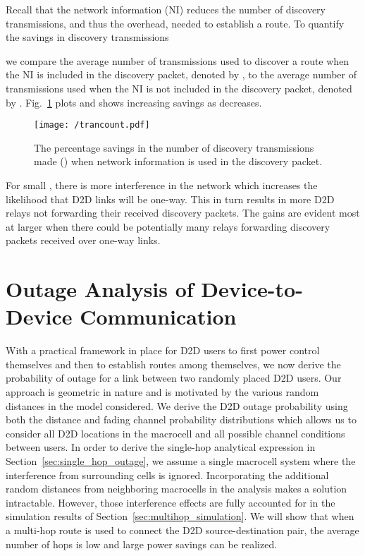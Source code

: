 \documentclass[10pt, final, journal, letterpaper,oneside, twocolumn]{IEEEtran}
\begin{document}
Recall that the network information (NI) reduces the number of discovery transmissions, and thus the overhead, needed to establish a route.  To quantify the savings in discovery transmissions 
 
we compare the average number of transmissions used to discover a route when the NI is included in the discovery packet, denoted by , to the average number of transmissions used when the NI is not included in the discovery packet, denoted by .  Fig.~\ref{fig:trancount} plots  and shows increasing savings as  decreases.
\begin{figure}[htp]
\center
  \texttt{[image: /trancount.pdf]}
  \caption[]{The percentage savings in the number of discovery transmissions made () when network information is used in the discovery packet.} 
  \label{fig:trancount} 
\end{figure} 
For small , there is more interference in the network which increases the likelihood  that D2D links will be one-way.  This in turn results in more D2D relays not forwarding their received discovery packets.  The gains are evident most at larger  when there could be potentially many relays forwarding discovery packets received over one-way links.  

\section{Outage Analysis of Device-to-Device Communication}
\label{sec:singlehopd2d}
With a practical framework in place for D2D users to first power control themselves and then to establish routes among themselves, we now derive the probability of outage for a link between two randomly placed D2D users.  Our approach is geometric in nature and is motivated by the various random distances in the model considered.  We derive the D2D outage probability using both the distance and fading channel probability distributions which allows us to consider all D2D locations in the macrocell and all possible channel conditions between users.  In order to derive the single-hop analytical expression in Section~\ref{sec:single_hop_outage}, we assume a single macrocell system where the interference from surrounding cells is ignored.  Incorporating the additional random distances from neighboring macrocells in the analysis makes a solution intractable.  However, those interference effects are fully accounted for in the simulation results of Section~\ref{sec:multihop_simulation}.  We will show that when a multi-hop route is used to connect the D2D source-destination pair, the average number of hops is low and large power savings can be realized.  
\end{document}
